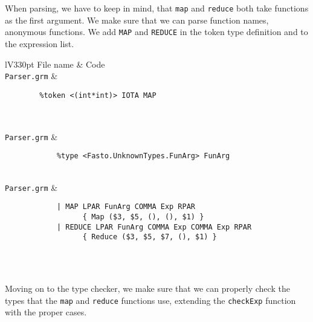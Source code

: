 \documentclass[a4paper]{article}
\newcommand{\command}[1]{\texttt{\string#1}}
\begin{document}
When parsing, we have to keep in mind, that \texttt{map} and \texttt{reduce} both take functions as thefirst argument. We make sure that we can parse function names, anonymous functions. We add \texttt{MAP} and \texttt{REDUCE} in the token type definition and to the expression list.

\begin{center}	
	\begin{tabular}{lV{330pt}}
		\toprule
		File name & Code\\
		\midrule
		\command{Parser.grm} &
		\begin{verbatim}
		%token <(int*int)> IOTA MAP
		
		\end{verbatim}
		\\
		\command{Parser.grm} &
		\begin{verbatim}
			%type <Fasto.UnknownTypes.FunArg> FunArg

		\end{verbatim}
		\\
		\command{Parser.grm} &
		\begin{verbatim}
			| MAP LPAR FunArg COMMA Exp RPAR
			      { Map ($3, $5, (), (), $1) }
			| REDUCE LPAR FunArg COMMA Exp COMMA Exp RPAR
			      { Reduce ($3, $5, $7, (), $1) }
		\end{verbatim}
		\\
		\bottomrule \\
	\end{tabular}
\end{center}

Moving on to the type checker, we make sure that we can properly check the types that the \verb|map| and \verb|reduce| functions use, extending the \verb|checkExp| function with the proper cases.
\end{document}
